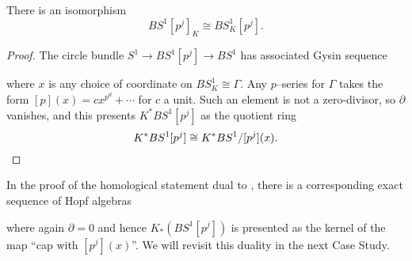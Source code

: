 \begin{theorem}\label{KtheoryConvertsTorsionToTorsion}
There is an isomorphism \[BS^1[p^j]_K \cong BS^1_K[p^j].\]
\end{theorem}
\begin{proof}
The circle bundle \(S^1 \to BS^1[p^j] \to BS^1\) has associated Gysin sequence
\begin{center}
\end{center}
where \(x\) is any choice of coordinate on \(BS^1_{K} \cong \Gamma\).  Any \(p\)--series for \(\Gamma\) takes the form \([p](x) = c x^{p^d} + \cdots\) for \(c\) a unit.  Such an element is not a zero-divisor, so \(\partial\) vanishes, and this presents \(K^* BS^1[p^j]\) as the quotient ring \[K^* BS^1[p^j] \cong K^* BS^1 / [p^j](x). \qedhere\]
\end{proof}

\begin{remark}\label{KHomologyOfClassifyingSpace}
In the proof of the homological statement dual to , there is a corresponding exact sequence of Hopf algebras
\begin{center}
\end{center}
where again \(\partial = 0\) and hence \(K_*(BS^1[p^j])\) is presented as the kernel of the map ``cap with \([p^j](x)\)''.  We will revisit this duality in the next Case Study.
\end{remark}

